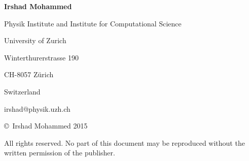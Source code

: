 
\noindent
{\bf Irshad Mohammed}

\begin{small}
\vspace{1mm}

\noindent
Physik Institute and Institute for Computational Science

\noindent
University of Zurich

\noindent
Winterthurerstrasse 190

\noindent
CH-8057 Z\"urich

\noindent
Switzerland

\vspace{1mm}

\noindent
irshad@physik.uzh.ch

\vfill

\noindent
\copyright \ Irshad Mohammed 2015

\vspace{1mm}

\noindent
All rights reserved. No part of this document may be reproduced without the written permission of the publisher.




\end{small}
